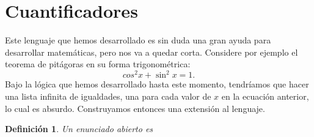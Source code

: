 \documentclass{book}
\newtheorem{df}{Definición}[chapter]
\begin{document}
\section{Cuantificadores}
Este lenguaje que hemos desarrollado es sin duda una gran ayuda para desarrollar matemáticas, pero nos va a quedar corta.
Considere por ejemplo el teorema de pitágoras en su forma trigonométrica: \[cos^2 x + \sin^2 x = 1.\]
Bajo la lógica que hemos desarrollado hasta este momento, tendríamos que hacer una lista infinita de igualdades, una para cada valor de $x$ en la ecuación anterior, lo cual es absurdo.
Construyamos entonces una extensión al lenguaje.

\begin{df}
	Un enunciado abierto es %
\end{df}
\end{document}
